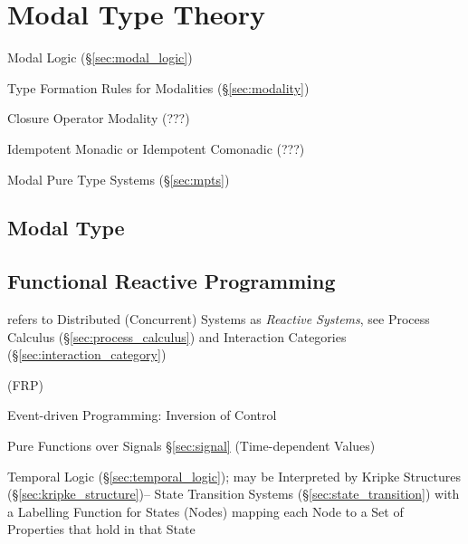 \section{Modal Type Theory}\label{sec:modal_type_theory}

Modal Logic (\S\ref{sec:modal_logic})

Type Formation Rules for Modalities (\S\ref{sec:modality})

Closure Operator Modality (???)

Idempotent Monadic or Idempotent Comonadic (???)

Modal Pure Type Systems (\S\ref{sec:mpts})



\subsection{Modal Type}\label{sec:modal_type}

\subsection{Functional Reactive Programming}\label{sec:frp}


\fist \cite{winskel-nielsen93} refers to Distributed (Concurrent)
Systems as \emph{Reactive Systems}, see Process Calculus
(\S\ref{sec:process_calculus}) and Interaction Categories
(\S\ref{sec:interaction_category})

(FRP)

Event-driven Programming: Inversion of Control %

Pure Functions over Signals \S\ref{sec:signal} (Time-dependent Values)

Temporal Logic (\S\ref{sec:temporal_logic}); may be Interpreted by
Kripke Structures (\S\ref{sec:kripke_structure})-- State Transition
Systems (\S\ref{sec:state_transition}) with a Labelling Function for
States (Nodes) mapping each Node to a Set of Properties that hold in
that State

